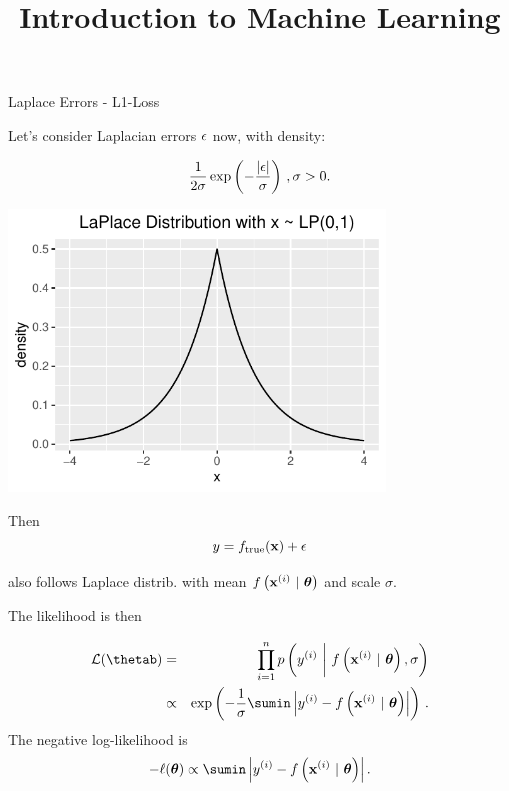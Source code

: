 \documentclass[11pt,compress,t,notes=noshow, xcolor=table]{beamer}
\title{Introduction to Machine Learning}
\begin{document}
    

\begin{vbframe}{Laplace Errors - L1-Loss}

Let's consider Laplacian errors $\epsilon$ now, with density: 

\begin{minipage}{0.5\textwidth}
$$
 \frac{1}{2\sigma} \exp\left(-\frac{|\epsilon|}{\sigma}\right)\,, \sigma > 0.
$$
\end{minipage}%
\begin{minipage}{0.5\textwidth}
\includegraphics[width = 0.75\textwidth]{figure/laplace_plot.pdf}
\end{minipage}
Then
$$
y = f_{\text{true}}(\mathbf{x}) + \epsilon 
$$

also follows Laplace distrib. with mean $f\left(\mathbf{x}^{(i)} ~|~ \bm{\theta}\right)$ and scale  $\sigma$. 

\framebreak 

The likelihood is then 

\begin{eqnarray*}
\LL(\thetab) &=& \prod_{i=1}^n \pdf\left(\yi ~\bigg|~ \fxit, \sigma\right) \\ &\propto& \exp\left(-\frac{1}{\sigma}\sumin \left|\yi - \fxit\right|\right)\,.
\end{eqnarray*}
The negative log-likelihood is
$$
- \loglt \propto \sumin \left|\yi - \fxit\right|.
$$


\end{vbframe}
\end{document}
